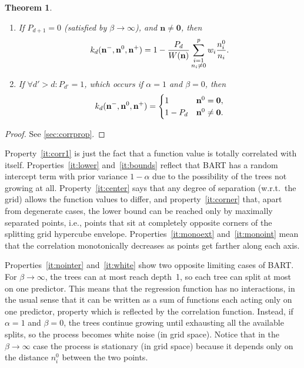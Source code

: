 \documentclass[a4paper]{article}
\newcommand{\nvecs}{\mathbf n^-, \mathbf n^0, \mathbf n^+}
\newtheorem{theorem}{Theorem}
\theoremstyle{definition}
\begin{document}
\begin{theorem}
\begin{enumerate}
            \item If $P_{d+1} = 0$ (satisfied by $\beta \to \infty$), and $\mathbf n \ne \mathbf 0$, then
            \begin{equation}
                k_d(\nvecs) = 1 - \frac{P_d}{W(\mathbf n)}
                \sum_{\substack{i=1 \\ n_i \ne 0}}^p w_i \frac{n^0_i}{n_i}. \notag
            \end{equation} \label{it:nointer}
            \item If $\forall d' > d : P_{d'} = 1$, which occurs if $\alpha = 1$ and $\beta = 0$, then \label{it:white}
            \begin{equation}
                k_d(\nvecs) = \begin{cases}
                    1 & \mathbf n^0 = \mathbf 0, \\
                    1 - P_d & \mathbf n^0 \ne \mathbf 0.
                \end{cases} \notag
            \end{equation}
            
        \end{enumerate}
    \end{theorem}

    \begin{proof}
        See \autoref{sec:corrprop}.
    \end{proof}
    
    Property~\ref{it:corr1} is just the fact that a function value is totally correlated with itself. Properties~\ref{it:lower} and~\ref{it:bounds} reflect that BART has a random intercept term with prior variance $1 - \alpha$ due to the possibility of the trees not growing at all. Property~\ref{it:center} says that any degree of separation (w.r.t.\ the grid) allows the function values to differ, and property~\ref{it:corner} that, apart from degenerate cases, the lower bound can be reached only by maximally separated points, i.e., points that sit at completely opposite corners of the splitting grid hypercube envelope. Properties~\ref{it:monoext} and~\ref{it:monoint} mean that the correlation monotonically decreases as points get farther along each axis.
        
    Properties~\ref{it:nointer} and~\ref{it:white} show two opposite limiting cases of BART. For $\beta \to \infty$, the trees can at most reach depth~1, so each tree can split at most on one predictor. This means that the regression function has no interactions, in the usual sense that it can be written as a sum of functions each acting only on one predictor, property which is reflected by the correlation function. Instead, if $\alpha = 1$ and $\beta = 0$, the trees continue growing until exhausting all the available splits, so the process becomes white noise (in grid space). Notice that in the $\beta \to \infty$ case the process is stationary (in grid space) because it depends only on the distance $n^0_i$ between the two points.
    
\end{document}
